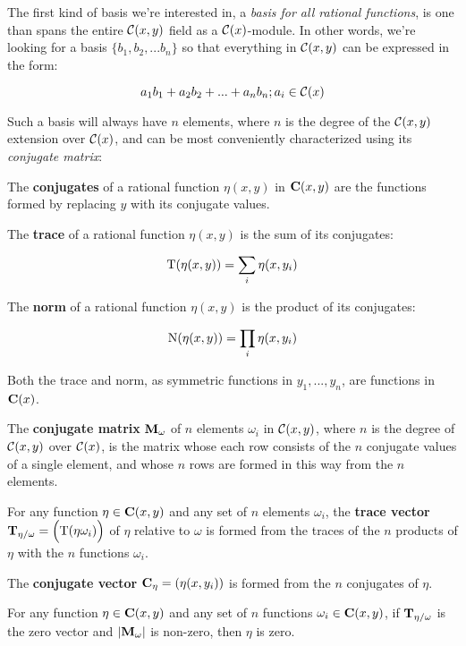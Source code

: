 The first kind of basis we're interested in, a {\it basis for all
rational functions}, is one than spans the entire ${\cal C}(x,y)$ field
as a ${\cal C}(x)$-module.
In other words, we're looking for a basis $\{b_1, b_2,
... b_n\}$ so that everything in ${\cal C}(x,y)$ can be expressed
in the form:

	$$ a_1 b_1 + a_2 b_2 + ... + a_n b_n; a_i \in {\cal C}(x) $$

Such a basis will always have $n$ elements, where $n$ is the degree of
the ${\cal C}(x,y)$ extension over ${\cal C}(x)$, and can be most
conveniently characterized using its {\it conjugate matrix}:


The {\bf conjugates} of a rational function $\eta(x,y)$ in ${\bf
C}(x,y)$ are the functions formed by replacing $y$ with its conjugate
values.

The {\bf trace} of a rational function $\eta(x,y)$ is the sum of
its conjugates:

$${\rm T}(\eta(x,y)) = \sum_i \eta(x,y_i)$$

The {\bf norm} of a rational function $\eta(x,y)$ is the product of
its conjugates:

$${\rm N}(\eta(x,y)) = \prod_i \eta(x,y_i)$$

Both the trace and norm, as symmetric functions in $y_1,...,y_n$, are
functions in ${\bf C}(x)$.

The {\bf conjugate matrix} ${\bf M}_\omega$ of $n$ elements $\omega_i$
in ${\cal C}(x,y)$, where $n$ is the degree of ${\cal C}(x,y)$ over
${\cal C}(x)$, is the matrix whose each row consists of the $n$
conjugate values of a single element, and whose $n$ rows are formed in
this way from the $n$ elements.

\enddefinition


For any function $\eta \in {\bf C}(x,y)$ and any set of $n$ elements
$\omega_i$, the {\bf trace vector}
${\bf T}_{\eta/\omega} = \Big({\rm T}(\eta \omega_i)\Big)$ 
of $\eta$ relative to $\omega$
is formed from the
traces of the $n$ products of $\eta$ with the $n$ functions
$\omega_i$.

The {\bf conjugate vector} ${\bf C}_\eta = (\eta(x,y_i))$ is formed from the
$n$ conjugates of $\eta$.

\enddefinition

\theorem
\label{function is zero if trace vector is zero}

For any function $\eta \in {\bf C}(x,y)$ and any set of $n$ functions
$\omega_i \in {\bf C}(x,y)$, if ${\bf T}_{\eta/\omega}$ is the zero vector
and $|{\bf M}_\omega|$ is non-zero, then $\eta$ is zero.

